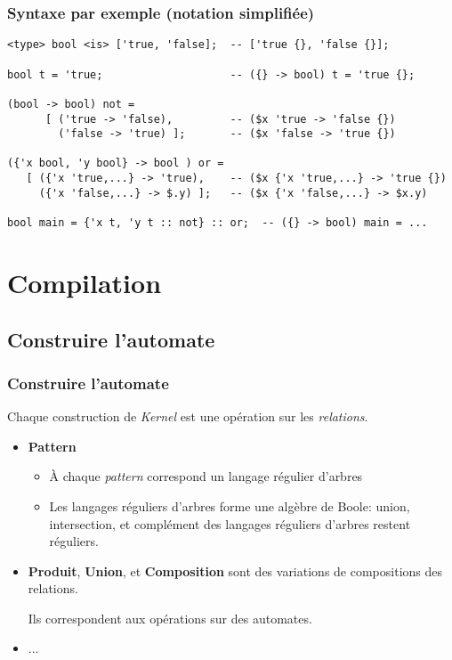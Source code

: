\documentclass{beamer}
\newcommand{\mypause}{\pause}
\newcommand{\Kernel}{\textit{Kernel}}
\begin{document}
\begin{frame}[fragile]
\frametitle{Syntaxe par exemple (notation simplifiée)}\color{blue}
\footnotesize 
\begin{verbatim}
<type> bool <is> ['true, 'false];  -- ['true {}, 'false {}];

bool t = 'true;                    -- ({} -> bool) t = 'true {}; 

(bool -> bool) not =
      [ ('true -> 'false),         -- ($x 'true -> 'false {})    
        ('false -> 'true) ];       -- ($x 'false -> 'true {})

({'x bool, 'y bool} -> bool ) or = 
   [ ({'x 'true,...} -> 'true),    -- ($x {'x 'true,...} -> 'true {})
     ({'x 'false,...} -> $.y) ];   -- ($x {'x 'false,...} -> $x.y)   	

bool main = {'x t, 'y t :: not} :: or;  -- ({} -> bool) main = ...
\end{verbatim}
\end{frame}


\section{Compilation}



\subsection{Construire l'automate} 
\begin{frame}
  \frametitle{Construire l'automate}
  Chaque construction de \Kernel{} est une opération sur les \emph{relations}.
  \begin{itemize}
  \item \textbf{Pattern} \mypause
    \begin{itemize}
    \item À chaque \emph{pattern} correspond un \alert{langage régulier d'arbres}
    \item Les langages réguliers d'arbres forme une algèbre de Boole:
      union, intersection, et complément des langages réguliers
      d'arbres restent réguliers.
    \end{itemize} 
    \mypause
  \item \textbf{Produit}, \textbf{Union}, et \textbf{Composition}
    \mypause sont des variations de compositions des relations.

    \mypause Ils correspondent aux opérations sur des automates.
  \item ...
  \end{itemize}
\end{frame}
\end{document}
